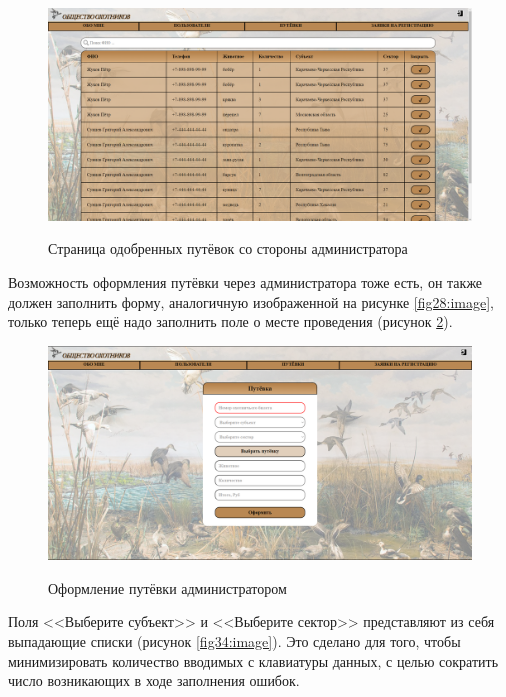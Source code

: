 	\begin{figure}[h!]
		\centering
		\begin{center}
			{\includegraphics[scale=0.34]{schemes/screens/vouchers_admin.png}}
			\caption{Страница одобренных путёвок со стороны администратора}
			\label{fig32:image}
		\end{center}
	\end{figure}
	\newpage

	Возможность оформления путёвки через администратора тоже есть, он также должен заполнить форму, аналогичную изображенной на рисунке \ref{fig28:image}, только теперь  ещё надо заполнить поле о месте проведения (рисунок \ref{fig33:image}).
	
	\begin{figure}[h!]
		\centering
		\begin{center}
			{\includegraphics[scale=0.34]{schemes/screens/create_admin.png}}
			\caption{Оформление путёвки администратором}
			\label{fig33:image}
		\end{center}
	\end{figure}
	\newpage

	Поля <<Выберите субъект>> и <<Выберите сектор>> представляют из себя выпадающие списки (рисунок \ref{fig34:image}). Это сделано для того, чтобы минимизировать количество вводимых с клавиатуры данных, с целью сократить число возникающих в ходе заполнения ошибок.
	
